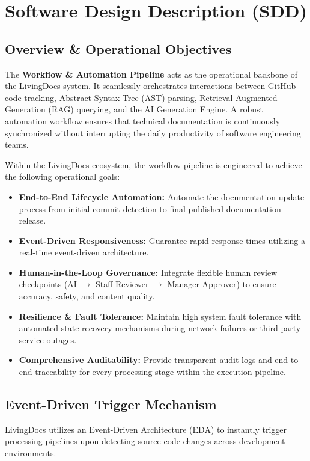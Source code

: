 \chapter{Software Design Description (SDD)}

\section{Overview \& Operational Objectives}
The \textbf{Workflow \& Automation Pipeline} acts as the operational backbone of the LivingDocs system. It seamlessly orchestrates interactions between GitHub code tracking, Abstract Syntax Tree (AST) parsing, Retrieval-Augmented Generation (RAG) querying, and the AI Generation Engine. A robust automation workflow ensures that technical documentation is continuously synchronized without interrupting the daily productivity of software engineering teams.

Within the LivingDocs ecosystem, the workflow pipeline is engineered to achieve the following operational goals:
\begin{itemize}
    \item \textbf{End-to-End Lifecycle Automation:} Automate the documentation update process from initial commit detection to final published documentation release.
    \item \textbf{Event-Driven Responsiveness:} Guarantee rapid response times utilizing a real-time event-driven architecture.
    \item \textbf{Human-in-the-Loop Governance:} Integrate flexible human review checkpoints (AI $\rightarrow$ Staff Reviewer $\rightarrow$ Manager Approver) to ensure accuracy, safety, and content quality.
    \item \textbf{Resilience \& Fault Tolerance:} Maintain high system fault tolerance with automated state recovery mechanisms during network failures or third-party service outages.
    \item \textbf{Comprehensive Auditability:} Provide transparent audit logs and end-to-end traceability for every processing stage within the execution pipeline.
\end{itemize}

\section{Event-Driven Trigger Mechanism}

LivingDocs utilizes an Event-Driven Architecture (EDA) to instantly trigger processing pipelines upon detecting source code changes across development environments.

